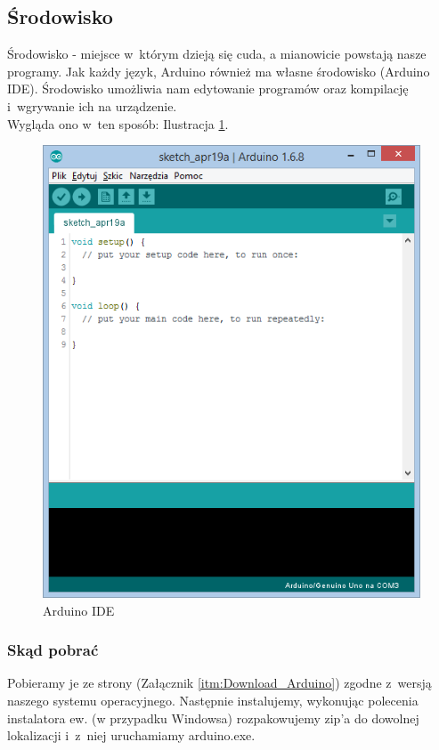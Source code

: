 \documentclass[a4paper,12pt, twoside]{article}
\begin{document}
	\subsection{Środowisko}
	\label{subsec:Srodowisko}
	Środowisko - miejsce w~którym dzieją się cuda, a mianowicie powstają nasze programy. Jak każdy język, Arduino również ma własne środowisko (Arduino IDE).
	Środowisko umożliwia nam edytowanie programów oraz kompilację i~wgrywanie ich na urządzenie.\\ %
		Wygląda ono w~ten sposób: Ilustracja \ref{fig:IDE}.
	\begin{figure}[h]
			\centering
			\includegraphics[scale=0.7]{ArduinoIDE.png}
			\caption{Arduino IDE}
			\label{fig:IDE}
		\end{figure}
	\subsubsection{Skąd pobrać}
	Pobieramy je ze strony (Załącznik \ref{itm:Download_Arduino}) zgodne z~wersją naszego systemu operacyjnego. Następnie instalujemy, wykonując polecenia instalatora
	ew. (w przypadku Windowsa) rozpakowujemy zip'a do dowolnej lokalizacji i~z~niej uruchamiamy arduino.exe.
\end{document}
